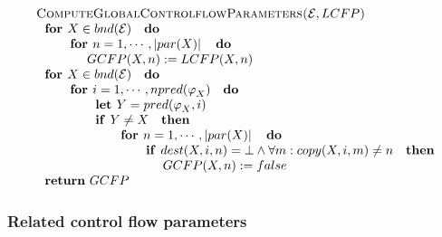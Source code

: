 \begin{equation*}
\begin{tabular}{l}
\textsc{ComputeGlobalControlflowParameters(}$\mathcal{E},LCFP$\textsc{)} \\ 
$\text{\textbf{for }}X\in bnd(\mathcal{E})\text{ \textbf{do}}$ \\ 
$\qquad \text{\textbf{for }}n=1,\cdots ,\left\vert par(X)\right\vert \text{ 
\textbf{do}}$ \\ 
$\qquad \qquad GCFP(X,n):=LCFP(X,n)$ \\ 
$\text{\textbf{for }}X\in bnd(\mathcal{E})\text{ \textbf{do}}$ \\ 
$\qquad \text{\textbf{for }}i=1,\cdots ,npred(\varphi _{X})\text{ \textbf{do}%
}$ \\ 
$\qquad \qquad \text{\textbf{let }}Y=pred(\varphi _{X},i)$ \\ 
$\qquad \qquad \text{\textbf{if }}Y\neq X\text{ \textbf{then}}$ \\ 
$\qquad \qquad \qquad \text{\textbf{for }}n=1,\cdots ,\left\vert
par(X)\right\vert \text{ \textbf{do}}$ \\ 
$\qquad \qquad \qquad \qquad \text{\textbf{if }}dest(X,i,n)=\bot \wedge
\forall m:copy(X,i,m)\neq n\text{ \textbf{then}}$ \\ 
$\qquad \qquad \qquad \qquad \qquad GCFP(X,n):=false$ \\ 
$\text{\textbf{return} }GCFP$%
\end{tabular}%
\end{equation*}%
\newline

\subsubsection{Related control flow parameters}

